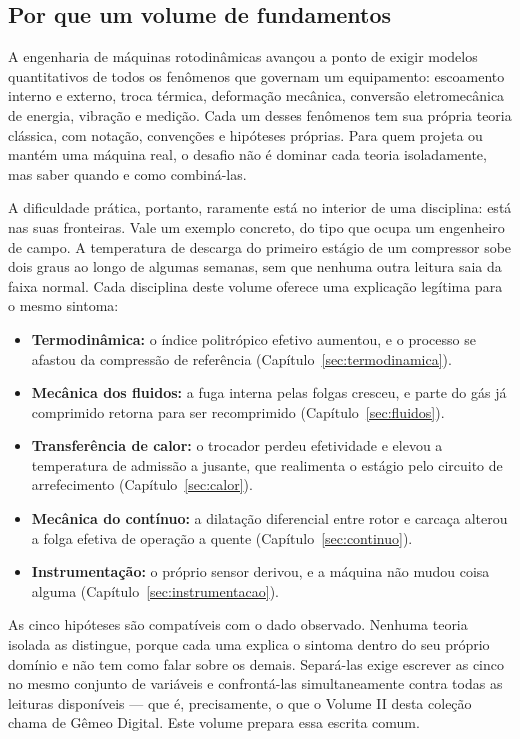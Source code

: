 \documentclass[12pt,a4paper]{article}
\numberwithin{equation}{section}
\numberwithin{table}{section}
\numberwithin{figure}{section}
\begin{document}
\subsection{Por que um volume de fundamentos}

A engenharia de máquinas rotodinâmicas avançou a ponto de exigir modelos
quantitativos de todos os fenômenos que governam um equipamento: escoamento
interno e externo, troca térmica, deformação mecânica, conversão
eletromecânica de energia, vibração e medição. Cada um desses fenômenos tem
sua própria teoria clássica, com notação, convenções e hipóteses próprias.
Para quem projeta ou mantém uma máquina real, o desafio não é dominar cada
teoria isoladamente, mas saber quando e como combiná-las.

A dificuldade prática, portanto, raramente está no interior de uma disciplina:
está nas suas fronteiras. Vale um exemplo concreto, do tipo que ocupa um
engenheiro de campo. A temperatura de descarga do primeiro estágio de um
compressor sobe dois graus ao longo de algumas semanas, sem que nenhuma outra
leitura saia da faixa normal. Cada disciplina deste volume oferece uma
explicação legítima para o mesmo sintoma:

\begin{itemize}
	\item \textbf{Termodinâmica:} o índice politrópico efetivo aumentou, e o
	processo se afastou da compressão de referência
	(Capítulo~\ref{sec:termodinamica}).
	\item \textbf{Mecânica dos fluidos:} a fuga interna pelas folgas cresceu, e
	parte do gás já comprimido retorna para ser recomprimido
	(Capítulo~\ref{sec:fluidos}).
	\item \textbf{Transferência de calor:} o trocador perdeu efetividade e
	elevou a temperatura de admissão a jusante, que realimenta o estágio pelo
	circuito de arrefecimento (Capítulo~\ref{sec:calor}).
	\item \textbf{Mecânica do contínuo:} a dilatação diferencial entre rotor e
	carcaça alterou a folga efetiva de operação a quente
	(Capítulo~\ref{sec:continuo}).
	\item \textbf{Instrumentação:} o próprio sensor derivou, e a máquina não
	mudou coisa alguma (Capítulo~\ref{sec:instrumentacao}).
\end{itemize}

As cinco hipóteses são compatíveis com o dado observado. Nenhuma teoria
isolada as distingue, porque cada uma explica o sintoma dentro do seu próprio
domínio e não tem como falar sobre os demais. Separá-las exige escrever as
cinco no mesmo conjunto de variáveis e confrontá-las simultaneamente contra
todas as leituras disponíveis --- que é, precisamente, o que o Volume II desta
coleção chama de Gêmeo Digital. Este volume prepara essa escrita comum.
\end{document}
